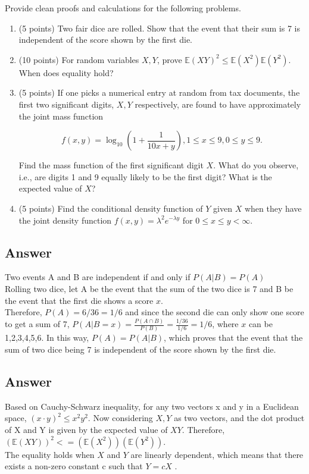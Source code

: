 Provide clean proofs and calculations for the following problems. 

\begin{tcolorbox}
	\begin{enumerate}
		\item  (5 points)  Two fair dice are rolled. Show that the event that their sum is 7 is independent of the score shown by the first die.  
         \item  (10 points)    For random variables $X,Y$, prove $\mathbb{E}(XY)^2 \leq \mathbb{E}(X^2)\mathbb{E}(Y^2)$. When does equality hold?
    
         \item  (5 points)   If one picks a numerical entry at random from tax documents, the first two significant digits, $X, Y$ respectively, are found to have approximately the joint mass function 

         $$ f(x,y) = \log_{10}(1+\frac{1}{10x+y}), 1\leq x\leq 9, 0\leq y\leq 9.$$

         Find the mass function of the first significant digit $X$. What do you observe, i.e., are digits 1 and 9 equally likely to be the first digit? What is the expected value of $X$?  

         \item  (5 points)  Find the conditional density function  of $Y$ given $X$ when they have the joint density function $f(x,y)=\lambda^2 e^{-\lambda y}$ for $0\leq x \leq y<\infty$. 
	\end{enumerate}
\end{tcolorbox}

 \subsection{Answer}
 Two events A and B are independent if and only if $P(A|B) = P(A)$\\
 Rolling two dice, let A be the event that the sum of the two dice is 7 and
 B be the event that the first die shows a score $x$. \\
 Therefore, $P(A) = 6/36 = 1/6$ and since the second die can only show one score to get a sum of 7,
 $P(A \vert B = x) = \frac{P(A\cap B)}{P(B)} = \frac{1/36}{1/6} =1/6$, where $x$ can be 1,2,3,4,5,6.
 In this way, $P(A) = P(A \vert B)$, which proves that the event that the sum of two dice being 7 is
 independent of the score shown by the first die.

 \subsection{Answer}
 Based on Cauchy-Schwarz inequality, for any two vectors x and y in a Euclidean space,
 $(x\cdot y)^2 \leq x^2 y^2$. Now considering $X, Y$ as two vectors, 
 and the dot product of X and Y is given by the expected value of $XY$. Therefore,
 $(\mathbb{E}(XY))^2 <= (\mathbb{E}(X^2))(\mathbb{E}(Y^2))$. \\
 The equality holds when $X$ and $Y$ are linearly dependent, 
 which means that there exists a non-zero constant c such that $Y = cX$ .


